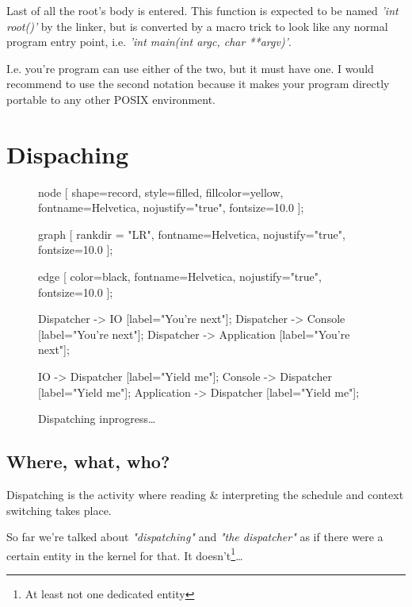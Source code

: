 		Last of all the root's body is entered. This function is expected to be named \textit{'int root()'} by the linker, but is converted by a macro trick to look like any normal program entry point, i.e. \textit{'int main(int argc, char **argv)'}. 

		I.e. you're program can use either of the two, but it must have one. I would recommend to use the second notation because it makes your program directly portable to any other POSIX environment.




\chapter{Dispaching}

\begin{figure}[!hbp]
\begin{dotpic}
	node [
		shape=record,
		style=filled,
		fillcolor=yellow,
		fontname=Helvetica,
		nojustify="true",
		fontsize=10.0
	];

	graph [
		rankdir = "LR",
		fontname=Helvetica,
		nojustify="true",
		fontsize=10.0
	];

	edge [
		color=black,
		fontname=Helvetica,
		nojustify="true",
		fontsize=10.0
	];

	Dispatcher -> IO		[label="You're next"];
	Dispatcher -> Console		[label="You're next"];
	Dispatcher -> Application 	[label="You're next"];

	IO -> Dispatcher		[label="Yield me"];
	Console -> Dispatcher		[label="Yield me"];
	Application -> Dispatcher	[label="Yield me"];
\end{dotpic}
\caption{Dispatching inprogress\ldots\label{disp1}}	
\end{figure}

\section{Where, what, who?}
Dispatching is the activity where reading \& interpreting the schedule and context switching takes place.

So far we're talked about \textit{"dispatching"} and \textit{"the dispatcher"} as if there were a certain entity in the kernel for that. It doesn't\footnote{At least not one dedicated entity}\ldots

